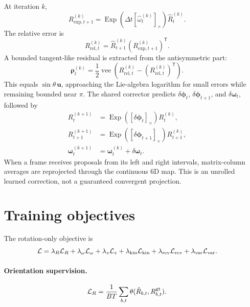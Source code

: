 \documentclass[11pt,a4paper]{article}
\newcommand{\Exp}{\operatorname{Exp}}
\newcommand{\vect}[1]{\mathbf{#1}}
\begin{document}
At iteration $k$,
\begin{equation}
R_{\mathrm{exp},t+1}^{(k)}=\Exp(\Delta t[\hat\omega_t^{(k)}]_\times)\hat R_t^{(k)}.
\end{equation}
The relative error is
\begin{equation}
R_{\mathrm{rel},t}^{(k)}=\hat R_{t+1}^{(k)}(R_{\mathrm{exp},t+1}^{(k)})^\mathsf T.
\end{equation}
A bounded tangent-like residual is extracted from the antisymmetric part:
\begin{equation}
\vect\rho_t^{(k)}=\frac12\operatorname{vee}(R_{\mathrm{rel},t}^{(k)}-(R_{\mathrm{rel},t}^{(k)})^\mathsf T).
\end{equation}
This equals $\sin\theta\,\vect u$, approaching the Lie-algebra logarithm for small errors while remaining bounded near $\pi$. The shared corrector predicts $\delta\vect\phi_t$, $\delta\vect\phi_{t+1}$, and $\delta\vect\omega_t$, followed by
\begin{align}
R_t^{(k+1)}&=\Exp([\delta\vect\phi_t]_\times)R_t^{(k)},\\
R_{t+1}^{(k+1)}&=\Exp([\delta\vect\phi_{t+1}]_\times)R_{t+1}^{(k)},\\
\vect\omega_t^{(k+1)}&=\vect\omega_t^{(k)}+\delta\vect\omega_t.
\end{align}
When a frame receives proposals from its left and right intervals, matrix-column averages are reprojected through the continuous 6D map. This is an unrolled learned correction, not a guaranteed convergent projection.

\section{Training objectives}
The rotation-only objective is
\begin{equation}
\mathcal L=\lambda_R\mathcal L_R+\lambda_\omega\mathcal L_\omega+
\lambda_z\mathcal L_z+\lambda_{\rm kin}\mathcal L_{\rm kin}+
\lambda_{\rm rev}\mathcal L_{\rm rev}+\lambda_{\rm var}\mathcal L_{\rm var}.
\end{equation}

\paragraph{Orientation supervision.}
\begin{equation}
\mathcal L_R=\frac1{BT}\sum_{b,t}\theta(\hat R_{b,t},R_{b,t}^{\rm gt}).
\end{equation}
\end{document}

